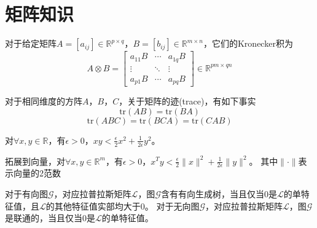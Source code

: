 \section{矩阵知识}
\begin{definition}\cite{ren2008distributed}
    对于给定矩阵$A=[a_{ij}]\in\mathbb{R}^{p\times q}$，$B=[b_{ij}]\in\mathbb{R}^{m\times n}$，它们的Kronecker积为
    \begin{equation}
        A\otimes B=\left[\begin{matrix} a_{11}B&\cdots&a_{1q}B\\\vdots&\ddots&\vdots\\a_{p1}B&\cdots&a_{pq}B\end{matrix}\right]\in\mathbb{R}^{pm\times qn}
    \end{equation}
\end{definition}
\begin{lemma}
    对于相同维度的方阵$A$，$B$，$C$，关于矩阵的迹(trace)，有如下事实
    \begin{equation}
        \text{tr}(AB)=\text{tr}(BA)
    \end{equation}
    \begin{equation}
        \text{tr}(ABC)=\text{tr}(BCA)=\text{tr}(CAB)
    \end{equation}
\end{lemma}
\begin{lemma}[杨氏不等式]
    \label{lm:young}
    对$\forall x,y\in\mathbb{R}$，有$\epsilon>0$，$xy<\frac{\epsilon}{2}x^2+\frac{1}{2\epsilon}y^2$。
    
    拓展到向量，对$\forall x,y\in\mathbb{R}^m$，有$\epsilon>0$，$x^Ty<\frac{\epsilon}{2}\parallel x\parallel^2+\frac{1}{2\epsilon}\parallel y\parallel^2$。
    其中$\parallel \cdot \parallel$表示向量的2范数 
\end{lemma}
\begin{lemma}\cite{ren2008distributed}
    \label{eigenL}
    对于有向图$\mathcal{G}$，对应拉普拉斯矩阵$\mathcal{L}$，图$\mathcal{G}$含有有向生成树，当且仅当0是$\mathcal{L}$的单特征值，且$\mathcal{L}$的其他特征值实部均大于0。
    对于无向图$\mathcal{G}$，对应拉普拉斯矩阵$\mathcal{L}$，图$\mathcal{G}$是联通的，当且仅当0是$\mathcal{L}$的单特征值。
\end{lemma}

